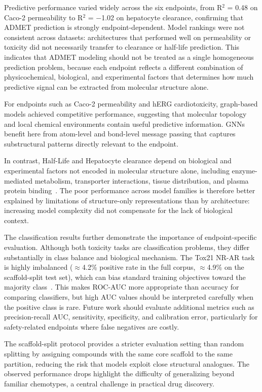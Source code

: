 \documentclass[journal]{IEEEtran}
\begin{document}
Predictive performance varied widely across the six endpoints, from R$^2$ = 0.48 on Caco-2 permeability to R$^2$ = $-$1.02 on hepatocyte clearance, confirming that ADMET prediction is strongly endpoint-dependent. Model rankings were not consistent across datasets: architectures that performed well on permeability or toxicity did not necessarily transfer to clearance or half-life prediction. This indicates that ADMET modeling should not be treated as a single homogeneous prediction problem, because each endpoint reflects a different combination of physicochemical, biological, and experimental factors that determines how much predictive signal can be extracted from molecular structure alone.

For endpoints such as Caco-2 permeability and hERG cardiotoxicity, graph-based models achieved competitive performance, suggesting that molecular topology and local chemical environments contain useful predictive information. GNNs benefit here from atom-level and bond-level message passing that captures substructural patterns directly relevant to the endpoint.

In contrast, Half-Life and Hepatocyte clearance depend on biological and experimental factors not encoded in molecular structure alone, including enzyme-mediated metabolism, transporter interactions, tissue distribution, and plasma protein binding~\cite{li2019dmpk,lai2022dmpk,bohnert2013proteinbinding}. The poor performance across model families is therefore better explained by limitations of structure-only representations than by architecture: increasing model complexity did not compensate for the lack of biological context.

The classification results further demonstrate the importance of endpoint-specific evaluation. Although both toxicity tasks are classification problems, they differ substantially in class balance and biological mechanism. The Tox21 NR-AR task is highly imbalanced ($\approx$4.2\% positive rate in the full corpus, $\approx$4.9\% on the scaffold-split test set), which can bias standard training objectives toward the majority class~\cite{he2009imbalanced}. This makes ROC-AUC more appropriate than accuracy for comparing classifiers, but high AUC values should be interpreted carefully when the positive class is rare. Future work should evaluate additional metrics such as precision-recall AUC, sensitivity, specificity, and calibration error, particularly for safety-related endpoints where false negatives are costly.

The scaffold-split protocol provides a stricter evaluation setting than random splitting by assigning compounds with the same core scaffold to the same partition, reducing the risk that models exploit close structural analogues. The observed performance drops highlight the difficulty of generalizing beyond familiar chemotypes, a central challenge in practical drug discovery.
\end{document}

